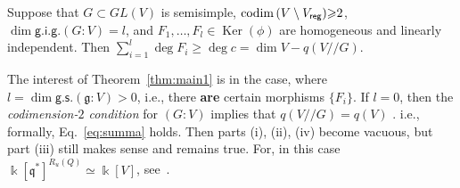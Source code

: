 \begin{lm}   \label{lm:neravenstvo-for-summa} 
Suppose that $G\subset GL(V)$ is semisimple, ${{\mathrm{codim\,}}}(V\setminus V_{\sf reg}){\geqslant} 2$, $\dim {\mathsf{g.i.g.}}(G:V)=l$, and 
$F_1,\dots,F_l\in {\operatorname{Ker}}(\phi)$ are homogeneous and  linearly independent. Then
$\sum_{i=1}^l \deg F_i{\geqslant} \deg c= \dim V-q(V{/\!\!/} G)$.
\end{lm}

\begin{rmk}
The interest of Theorem~\ref{thm:main1} is in the case, where $l=\dim \mathsf{g.s.}({{\mathfrak g}}:V)> 0$, i.e., there {\bf are} certain morphisms $\{F_i\}$. If $l=0$, then the {\sl codimension-$2$ condition} for $(G:V)$ implies that $q(V{/\!\!/} G)=q(V)$ \cite[Korollar\,4]{kn86}. i.e., formally, Eq.~\eqref{eq:summa} holds. Then parts (i), (ii), (iv) become vacuous, but part (iii) still makes sense and remains true. 
For, in this case ${\Bbbk}[{{\mathfrak q}}^*]^{R_u(Q)}\simeq {\Bbbk}[V]$, see~\cite[Theorem\,6.4]{p05}.
\end{rmk}

